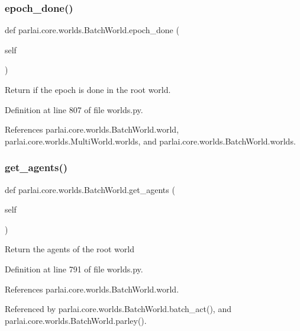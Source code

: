 \subsubsection{\texorpdfstring{epoch\+\_\+done()}{epoch\_done()}}
{\footnotesize\ttfamily def parlai.\+core.\+worlds.\+Batch\+World.\+epoch\+\_\+done (\begin{DoxyParamCaption}\item[{}]{self }\end{DoxyParamCaption})}

\begin{DoxyVerb}Return if the epoch is done in the root world.\end{DoxyVerb}
 

Definition at line 807 of file worlds.\+py.



References parlai.\+core.\+worlds.\+Batch\+World.\+world, parlai.\+core.\+worlds.\+Multi\+World.\+worlds, and parlai.\+core.\+worlds.\+Batch\+World.\+worlds.

\mbox{\label{classparlai_1_1core_1_1worlds_1_1BatchWorld_a1fc7faff8ccc60606ccff891d36e6b86}} 
\subsubsection{\texorpdfstring{get\+\_\+agents()}{get\_agents()}}
{\footnotesize\ttfamily def parlai.\+core.\+worlds.\+Batch\+World.\+get\+\_\+agents (\begin{DoxyParamCaption}\item[{}]{self }\end{DoxyParamCaption})}

\begin{DoxyVerb}Return the agents of the root world\end{DoxyVerb}
 

Definition at line 791 of file worlds.\+py.



References parlai.\+core.\+worlds.\+Batch\+World.\+world.



Referenced by parlai.\+core.\+worlds.\+Batch\+World.\+batch\+\_\+act(), and parlai.\+core.\+worlds.\+Batch\+World.\+parley().


